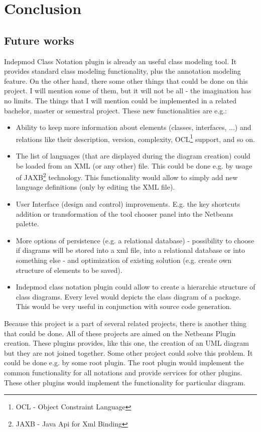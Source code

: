 \chapter{Conclusion}

\section{Future works}

Indepmod Class Notation plugin is already an useful class modeling tool. It provides standard class modeling functionality, plus the annotation modeling feature. On the other hand, there some other things that could be done on this project. I will mention some of them, but it will not be all - the imagination has no limits. The things that I will mention could be implemented in a related bachelor, master or semestral project. These new functionalities are e.g.:

\begin{itemize}
    \item Ability to keep more information about elements (classes, interfaces, ...) and relations like their description, version, complexity, OCL\footnote{OCL - Object Constraint Language} support, and so on.
    \item The list of languages (that are displayed during the diagram creation) could be loaded from an XML (or any other) file. This could be done e.g. by usage of JAXB\footnote{JAXB - Java Api for Xml Binding} technology. This functionality would allow to simply add new language definitions (only by editing the XML file).
    \item User Interface (design and control) improvements. E.g. the key shortcuts addition or transformation of the tool chooser panel into the Netbeans palette.
    \item More options of persistence (e.g. a relational database) - possibility to choose if diagrams will be stored into a xml file, into a relational database or into something else - and optimization of existing solution (e.g. create own structure of elements to be saved).
    \item Indepmod class notation plugin could allow to create a hierarchic structure of class diagrams. Every level would depicts the class diagram of a package. This would be very useful in conjunction with source code generation.
\end{itemize}

Because this project is a part of several related projects, there is another thing that could be done. All of these projects are aimed on the Netbeans Plugin creation. These plugins provides, like this one, the creation of an UML diagram but they are not joined together. Some other project could solve this problem. It could be done e.g. by some root plugin. The root plugin would implement the common functionality for all notations and provide services for other plugins. These other plugins would implement the functionality for particular diagram.

